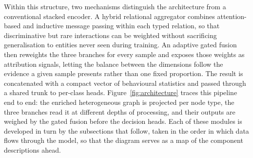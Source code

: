 \documentclass[%
    BCOR=10mm,
    DIV=13,
    toc=bibliography,
    toc=listof,
    oneside,
    12pt,
]{scrbook}
\begin{document}
Within this structure, two mechanisms distinguish the architecture from a
conventional stacked encoder. A hybrid relational aggregator combines
attention-based and inductive message passing within each typed relation, so
that discriminative but rare interactions can be weighted without sacrificing
generalisation to entities never seen during training. An adaptive gated
fusion then reweights the three branches for every sample and exposes those
weights as attribution signals, letting the balance between the dimensions
follow the evidence a given sample presents rather than one fixed proportion.
The result is concatenated with a compact vector of behavioural statistics and
passed through a shared trunk to per-class heads.
Figure~\ref{fig:architecture} traces this pipeline end to end: the enriched heterogeneous graph is projected per node
type, the three branches read it at different depths of processing, and their
outputs are weighed by the gated fusion before the decision heads. Each of
these modules is developed in turn by the subsections that follow, taken in the
order in which data flows through the model, so that the diagram serves as a map
of the component descriptions ahead.
\end{document}

